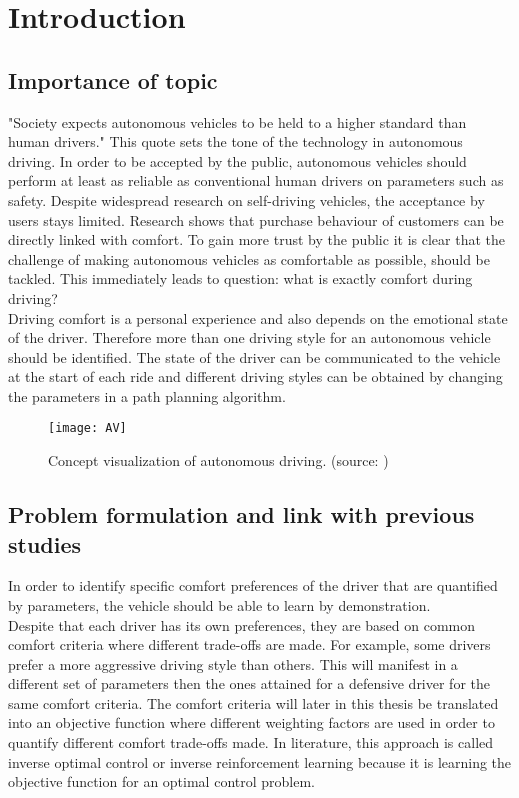 \chapter{Introduction}
\label{cha:intro}
\section{Importance of topic} \label{s:importance_topic}
"Society expects autonomous vehicles to be held to a higher standard than human drivers." \cite{Prof.Amnon} This quote sets the tone of the technology in autonomous driving. In order to be accepted by the public, autonomous vehicles should perform at least as reliable as conventional human drivers on parameters such as safety. Despite widespread research on self-driving vehicles, the acceptance by users stays limited.\cite{Bae2019} Research shows that purchase behaviour of customers can be directly linked with comfort. To gain more trust by the public it is clear that the challenge of making autonomous vehicles as comfortable as possible, should be tackled. This immediately leads to question: what is exactly comfort during driving?\\
Driving comfort is a personal experience and also depends on the emotional state of the driver. Therefore more than one driving style for an autonomous vehicle should be identified. \cite{Eindhoven2019} The state of the driver can be communicated to the vehicle at the start of each ride and different driving styles can be obtained by changing the parameters in a path planning algorithm. 

\begin{figure}[h!]
	\centering
	\texttt{[image: AV]}
	\caption{Concept visualization of autonomous driving. (source: \cite{AV})}
	\label{fig:AV}
\end{figure} 
\newpage

\section{Problem formulation and link with previous studies}
In order to identify specific comfort preferences of the driver that are quantified by parameters, the vehicle should be able to learn by demonstration. \cite{Kuderer2015a}\\
Despite that each driver has its own preferences, they are based on common comfort criteria where different trade-offs are made. For example, some drivers prefer a more aggressive driving style than others. This will manifest in a different set of parameters then the ones attained for a defensive driver for the same comfort criteria. The comfort criteria will later in this thesis be translated into an objective function where different weighting factors are used in order to quantify different comfort trade-offs made. In literature, this approach is called inverse optimal control or inverse reinforcement learning because it is learning the objective function for an optimal control problem.\\

